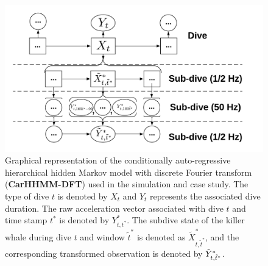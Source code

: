 
\begin{figure}[ht]
	\centering
	\includegraphics[width=5in]{../Plots/CarHHMM-DFT.png}
	\caption{Graphical representation of the conditionally auto-regressive hierarchical hidden Markov model with discrete Fourier transform (\textbf{CarHHMM-DFT}) used in the simulation and case study. The type of dive $t$ is denoted by $X_t$ and $Y_t$ represents the associated dive duration. The raw acceleration vector associated with dive $t$ and time stamp $t^*$ is denoted by $Y^*_{t,t^*}$. The subdive state of the killer whale during dive $t$ and window $\tilde t^*$ is denoted as $\tilde X^*_{t,\tilde t^*}$, and the corresponding transformed observation is denoted by $\tilde{Y}^*_{t,\tilde t^*}$.}
	\label{fig:CarHHMM-DFT}
\end{figure}

